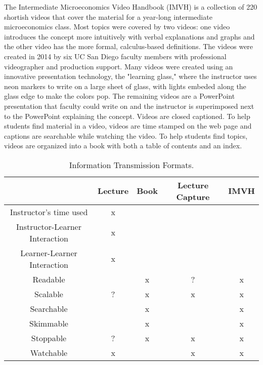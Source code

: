 \documentclass[12pt]{article}
\begin{document}
The Intermediate Microeconomics Video Handbook (IMVH) is a collection of 220 shortish videos that cover the material for a year-long intermediate microeconomics class.  Most topics were covered by two videos: one video introduces the concept more intuitively with verbal explanations and graphs and the other video has the more formal, calculus-based definitions.  The videos were created in 2014 by six UC San Diego faculty members with professional videographer and production support.  Many videos were created using an innovative presentation technology, the "learning glass," where the instructor uses neon markers to write on a large sheet of glass, with lights embeded along the glass edge to make the colors pop.  The remaining videos are a PowerPoint presentation that faculty could write on and the instructor is superimposed next to the PowerPoint explaining the concept.  Videos are closed captioned.  To help students find material in a video, videos are time stamped on the web page and captions are searchable while watching the video.  To help students find topics, videos are organized into a book with both a table of contents and an index.  


\begin{table}
	\caption{Information Transmission Formats.}
	\centering
	\begin{tabular}{c|c|c|c|c} 
		\hline
		& Lecture & Book &  Lecture Capture & IMVH\\
		\hline
		Instructor's time used & x  & & &\\
		Instructor-Learner Interaction & x & & &\\ 
		Learner-Learner Interaction & x & & & \\ 
		Readable & & x & ? & x \\ 
		Scalable & ? & x & x & x\\	
		Searchable & & x & & x \\ 
		Skimmable & & x & & x\\ 
		Stoppable & ? & x & x & x\\ 
		Watchable & x & & x & x\\ 
		
		\hline
		
	\end{tabular} 
	\label{infotransmission}
\end{table}
\end{document}
